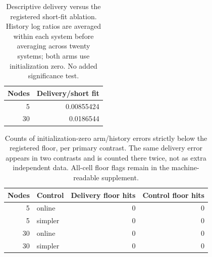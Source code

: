 \begin{table}[ht]
\centering\small
\begin{tabular}{rr}
\toprule
Nodes & Delivery/short fit\\
\midrule
5 & 0.00855424\\
30 & 0.0186544\\
\bottomrule
\end{tabular}
\caption{Descriptive delivery versus the registered short-fit ablation. History log ratios are averaged within each system before averaging across twenty systems; both arms use initialization zero. No added significance test.}
\end{table}
\begin{table}[ht]
\centering\small
\begin{tabular}{rlrr}
\toprule
Nodes & Control & Delivery floor hits & Control floor hits\\
\midrule
5 & online & 0 & 0\\
5 & simpler & 0 & 0\\
30 & online & 0 & 0\\
30 & simpler & 0 & 0\\
\bottomrule
\end{tabular}
\caption{Counts of initialization-zero arm/history errors strictly below the registered floor, per primary contrast. The same delivery error appears in two contrasts and is counted there twice, not as extra independent data. All-cell floor flags remain in the machine-readable supplement.}
\end{table}
